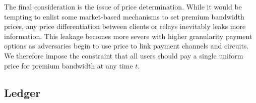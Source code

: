 The final consideration is the issue of price determination. While it
would be tempting to enlist some market-based mechanisms to set premium
bandwidth prices, any price differentiation between clients or relays inevitably
leaks more information. This leakage becomes more severe with higher granularity
payment options as adversaries begin to use price to link payment channels and
circuits. We therefore impose the constraint that all users should pay a single
uniform price for premium bandwidth at any time $t$. 




%


\subsection{Ledger}

